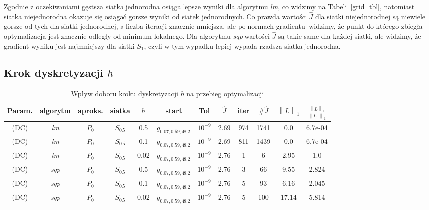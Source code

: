 \documentclass[licencjacka]{pracamgr}
\newcommand{\norm}[1]{\left\lVert#1\right\rVert}
\begin{document}
Zgodnie z oczekiwaniami gęstsza siatka jednorodna osiąga lepsze wyniki dla algorytmu {\it lm}, co widzimy na Tabeli~\ref{grid_tbl}, natomiast siatka niejednorodna okazuje się osiągać gorsze wyniki od siatek jednorodnych. Co prawda wartości $\hat{J}$ dla siatki niejednorodnej są niewiele gorsze od tych dla siatki jednorodnej, a liczba iteracji znacznie mniejsza, ale po normach gradientu, widzimy, że punkt do którego zbiegła optymalizacja jest znacznie odległy od minimum lokalnego. Dla algorytmu {\it sqp\/} wartości $\hat{J}$ są takie same dla każdej siatki, ale widzimy, że gradient wyniku jest najmniejszy dla siatki $S_1$, czyli w tym wypadku lepiej wypada rzadsza siatka jednorodna.

\subsection{Krok dyskretyzacji $h$}

\begin{table}[h]
  \begin{center}
    \begin{tabular}{|c|c|c|c|c|c|c||c|c|c|c|c|}
      \hline
      Param. & algorytm & aproks. & siatka & $h$ & start & Tol & $\hat{J}$ & iter & $\#\hat{J}$ & $\norm{L}_1$ & $\frac{\norm{L}_1}{\norm{L_0}_1}$ \\
      \hline
      (DC) & {\it lm\/} & $P_0$ & $S_{0.5}$ & 0.5 & $g_{0.07,0.59,48.2}$ & $10^{-9}$ & 2.69 & 974 & 1741 & 0.0 & 6.7e-04 \\
      \hline
      (DC) & {\it lm\/} & $P_0$ & $S_{0.5}$ & 0.1 & $g_{0.07,0.59,48.2}$ & $10^{-9}$ & 2.69 & 811 & 1439 & 0.0 & 6.7e-04 \\
      \hline
      (DC) & {\it lm\/} & $P_0$ & $S_{0.5}$ & 0.02 & $g_{0.07,0.59,48.2}$ & $10^{-9}$ & 2.76 & 1 & 6 & 2.95 & 1.0 \\
      \hline
      (DC) & {\it sqp\/} & $P_0$ & $S_{0.5}$ & 0.5 & $g_{0.07,0.59,48.2}$ & $10^{-9}$ & 2.76 & 3 & 66 & 9.55 & 2.824 \\
      \hline
      (DC) & {\it sqp\/} & $P_0$ & $S_{0.5}$ & 0.1 & $g_{0.07,0.59,48.2}$ & $10^{-9}$ & 2.76 & 5 & 93 & 6.16 & 2.045 \\
      \hline
      (DC) & {\it sqp\/} & $P_0$ & $S_{0.5}$ & 0.02 & $g_{0.07,0.59,48.2}$ & $10^{-9}$ & 2.76 & 5 & 100 & 17.14 & 5.814 \\
      \hline
    \end{tabular}
    \caption{Wpływ doboru kroku dyskretyzacji $h$ na przebieg optymalizacji}\label{step_tbl}
  \end{center}
\end{table}
\end{document}
